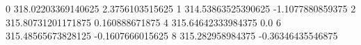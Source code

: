 0 318.02203369140625 2.3756103515625
1 314.53863525390625 -1.1077880859375
2 315.80731201171875 0.160888671875
4 315.64642333984375 0.0
6 315.48565673828125 -0.1607666015625
8 315.282958984375 -0.36346435546875
